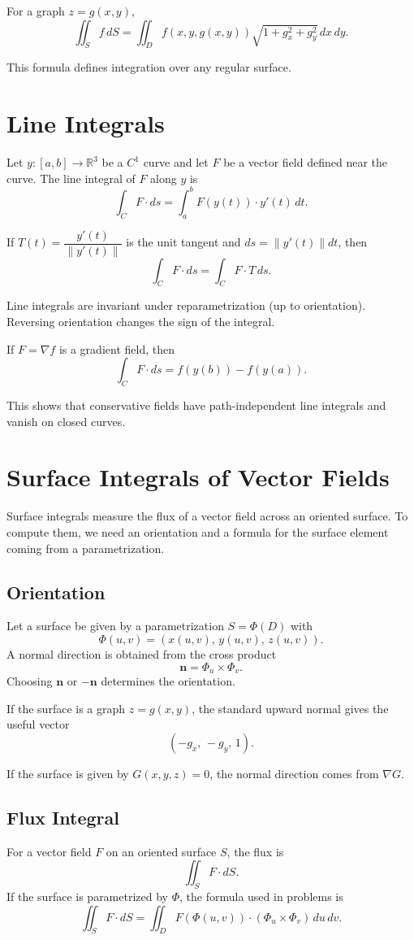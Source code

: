 \documentclass{article}
\begin{document}
For a graph \(z = g(x,y)\),
\[
\iint_S f\, dS = 
\iint_D f(x,y,g(x,y)) \sqrt{1 + g_x^2 + g_y^2}\, dx\, dy.
\]

This formula defines integration over any regular surface.

\section{Line Integrals}
Let \(y : [a,b] \to \mathbb{R}^3\) be a \(C^1\) curve and let \(F\) be a vector field defined near the curve.  
The line integral of \(F\) along \(y\) is
\[
\int_C F \cdot ds
=
\int_a^b F(y(t)) \cdot y'(t)\, dt.
\]

If \(T(t) = \dfrac{y'(t)}{\|y'(t)\|}\) is the unit tangent and \(ds = \|y'(t)\| dt\), then
\[
\int_C F \cdot ds = \int_C F \cdot T\, ds.
\]

Line integrals are invariant under reparametrization (up to orientation).  
Reversing orientation changes the sign of the integral.

If \(F = \nabla f\) is a gradient field, then
\[
\int_C F \cdot ds = f(y(b)) - f(y(a)).
\]

This shows that conservative fields have path-independent line integrals and vanish on closed curves.

\section{Surface Integrals of Vector Fields}

Surface integrals measure the flux of a vector field across an oriented surface.  
To compute them, we need an orientation and a formula for the surface element coming from a parametrization.

\subsection{Orientation}
Let a surface be given by a parametrization \(S = \Phi(D)\) with
\[
\Phi(u,v) = (x(u,v),\,y(u,v),\,z(u,v)).
\]
A normal direction is obtained from the cross product
\[
\mathbf{n} = \Phi_u \times \Phi_v.
\]
Choosing \(\mathbf{n}\) or \(-\mathbf{n}\) determines the orientation.

If the surface is a graph \(z = g(x,y)\), the standard upward normal gives the useful vector
\[
(-g_x,\,-g_y,\,1).
\]

If the surface is given by \(G(x,y,z)=0\), the normal direction comes from \(\nabla G\).

\subsection{Flux Integral}
For a vector field \(F\) on an oriented surface \(S\), the flux is
\[
\iint_S F \cdot dS.
\]
If the surface is parametrized by \(\Phi\), the formula used in problems is
\[
\iint_S F \cdot dS
=
\iint_D F(\Phi(u,v)) \cdot (\Phi_u \times \Phi_v)\, du\, dv.
\]
\end{document}
